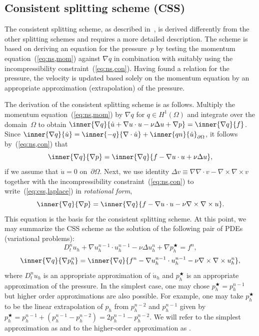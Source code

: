 \subsection{Consistent splitting scheme (CSS)}
\label{sec:css}

The consistent splitting scheme, as described in~\cite{guemin,gueshe},
is derived differently from the other splitting schemes and requires a
more detailed description. The scheme is based on deriving an equation
for the pressure~$p$ by testing the momentum
equation~(\ref{eq:ns,mom}) against $\nabla q$ in combination with
suitably using the incompressibility constraint~(\ref{eq:ns,con}).
Having found a relation for the pressure, the velocity is updated
based solely on the momentum equation by an appropriate approximation
(extrapolation) of the pressure.

The derivation of the consistent splitting scheme is as follows.
Multiply the momentum equation~(\ref{eq:ns,mom}) by $\nabla q$ for $q
\in H^1(\Omega)$ and integrate over the domain~$\Omega$ to obtain
$\inner{\nabla q}{\dot{u} + \nabla u \cdot u - \nu \Delta u + \nabla
  p} = \inner{\nabla q}{f}$. Since $\inner{\nabla q}{\dot{u}} =
\inner{-q}{\nabla \cdot \dot{u}} + \inner{qn}{\dot{u}}_{\partial
  \Omega}$, it follows by~(\ref{eq:ns,con}) that
\begin{equation}\label{eq:css,laplace}
  \inner{\nabla q}{\nabla p} = \inner{\nabla q}{f - \nabla u \cdot u +
    \nu \Delta u},
\end{equation}
if we assume that $\dot{u} = 0$ on~$\partial\Omega$. Next, we use
identity $\Delta v \equiv \nabla \nabla \cdot v - \nabla \times \nabla
\times v$ together with the incompressibility
constraint~(\ref{eq:ns,con}) to write~(\ref{eq:css,laplace}) in
\emph{rotational form},
\begin{equation}\label{eq:css,curl}
  \inner{\nabla q}{\nabla p} = \inner{\nabla q}{f - \nabla u \cdot u -
    \nu \nabla \times \nabla \times u}.
\end{equation}
This equation is the basis for the consistent splitting scheme. At
this point, we may summarize the CSS scheme as the solution of the
following pair of PDEs (variational problems):
\begin{equation} \label{eq:css,u}
  D_t^n u_h
  + \nabla u_h^{n-1} \cdot u_h^{n-1}
  - \nu \Delta u_h^n
  + \nabla p_h^{\bigstar}
  = f^n,
\end{equation}
\begin{equation} \label{eq:css,pn}
  \inner{\nabla q}{\nabla p_h^n} =
  \inner{\nabla q}{f^n -\nabla u_h^{n-1} \cdot u_h^{n-1} - \nu \nabla \times \nabla \times u_h^n},
\end{equation}
where $D_t^n u_h$ is an appropriate approximation of $\dot{u}_h$ and
$p^{\bigstar}_h$ is an appropriate approximation of the pressure. In
the simplest case, one may chose $p_h^{\bigstar} = p_h^{n-1}$ but
higher order approximations are also possible. For example, one may
take $p_h^{\bigstar}$ to be the linear extrapolation of $p_h$ from
$p_h^{n-2}$ and $p_h^{n-1}$ given by $p_h^{\bigstar} = p_h^{n-1} +
(p_h^{n-1} - p_h^{n-2}) = 2p_h^{n-1} - p_h^{n-2}$. We will refer to
the simplest approximation as  and to the higher-order
approximation as .

